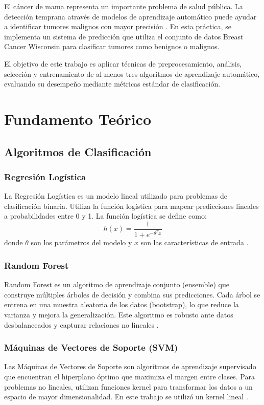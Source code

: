 \documentclass[conference]{IEEEtran}
\begin{document}
El cáncer de mama representa un importante problema de salud pública. La detección temprana através de modelos de aprendizaje automático puede ayudar a identificar tumores malignos con mayor precisión \cite{b2}. En esta práctica, se implementa un sistema de predicción que utiliza el conjunto de datos Breast Cancer Wisconsin para clasificar tumores como benignos o malignos.

El objetivo de este trabajo es aplicar técnicas de preprocesamiento, análisis, selección y entrenamiento de al menos tres algoritmos de aprendizaje automático, evaluando su desempeño mediante métricas estándar de clasificación.

\section{Fundamento Teórico} 

\subsection{Algoritmos de Clasificación}

\subsubsection{Regresión Logística}
La Regresión Logística es un modelo lineal utilizado para problemas de clasificación binaria. Utiliza la función logística para mapear predicciones lineales a probabilidades entre 0 y 1. La función logística se define como:
\begin{equation}
h(x) = \frac{1}{1 + e^{-\theta^T x}}
\end{equation}
donde $\theta$ son los parámetros del modelo y $x$ son las características de entrada \cite{b3}.

\subsubsection{Random Forest}
Random Forest es un algoritmo de aprendizaje conjunto (ensemble) que construye múltiples árboles de decisión y combina sus predicciones. Cada árbol se entrena en una muestra aleatoria de los datos (bootstrap), lo que reduce la varianza y mejora la generalización. Este algoritmo es robusto ante datos desbalanceados y capturar relaciones no lineales \cite{b4}.

\subsubsection{Máquinas de Vectores de Soporte (SVM)}
Las Máquinas de Vectores de Soporte son algoritmos de aprendizaje supervisado que encuentran el hiperplano óptimo que maximiza el margen entre clases. Para problemas no lineales, utilizan funciones kernel para transformar los datos a un espacio de mayor dimensionalidad. En este trabajo se utilizó un kernel lineal \cite{b5}.
\end{document}
